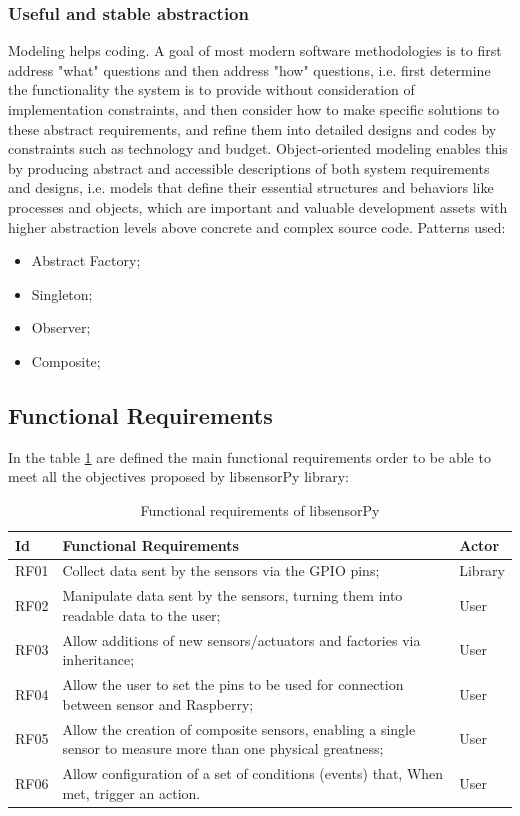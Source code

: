 \documentclass{acm_proc_article-sp}
\begin{document}
\subsubsection{Useful and stable abstraction}

Modeling helps coding. A goal of most modern software methodologies is to first address "what" questions and then address "how" questions, i.e. first determine the functionality the system is to provide without consideration of implementation constraints, and then consider how to make specific solutions to these abstract requirements, and refine them into detailed designs and codes by constraints such as technology and budget. Object-oriented modeling enables this by producing abstract and accessible descriptions of both system requirements and designs, i.e. models that define their essential structures and behaviors like processes and objects, which are important and valuable development assets with higher abstraction levels above concrete and complex source code.
\newline
\newline
Patterns used:
\begin{itemize}
\item Abstract Factory;
\item Singleton;
\item Observer;
\item Composite;
\end{itemize}

\subsection{Functional Requirements}
In the table \ref{table:rf} are defined the main functional requirements order to be able to meet all the objectives proposed by libsensorPy library:
 
\begin{table}[h]
 \caption{Functional requirements of libsensorPy}
 \label{table:rf}
 \begin{tabular}{|l|p{5.5cm}|l|}
 \hline  
 Id & Functional Requirements & Actor \\
 \hline  
 RF01 & Collect data sent by the sensors via the GPIO pins; & Library \\
 \hline 
 RF02 & Manipulate data sent by the sensors, turning them into readable data to the user; & User \\
 \hline 
 RF03 & Allow additions of new sensors/actuators and factories via inheritance; & User \\
 \hline 
 RF04 & Allow the user to set the pins to be used for connection between sensor and Raspberry; & User \\
 \hline 
 RF05 & Allow the creation of composite sensors, enabling a single sensor to measure more than one physical greatness; & User \\
 \hline 
 RF06 & Allow configuration of a set of conditions (events) that, When met, trigger an action. & User \\
\hline  
\end{tabular}
\end{table}
\end{document}
